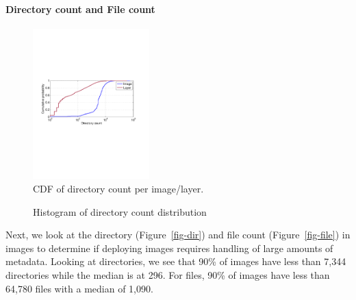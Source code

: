 \paragraph{Directory count and File count}
\begin{figure}
	\centering
	\includegraphics[width=0.4\textwidth]{graphs/dir-cnt-cdf.pdf}
	\caption{CDF of directory count per image/layer.
	}
	\label{fig:reference-cnt}
\end{figure}

\begin{figure}[!t]
	\centering
	\caption{Histogram of directory count distribution}
	\label{fig:reference-cnt}
\end{figure}

Next, we look at the directory (Figure~\ref{fig-dir}) and file count
(Figure~\ref{fig-file}) in images to determine if deploying images requires
handling of large amounts of metadata. Looking at directories, we see that 90\%
of images have less than 7,344 directories while the median is at 296. For
files, 90\% of images have less than 64,780 files with a median of 1,090.

